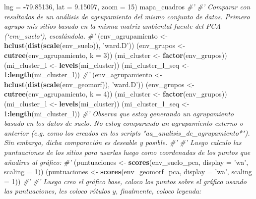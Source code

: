 \documentclass[11pt,]{article}
\newenvironment{Shaded}{\begin{snugshade}}{\end{snugshade}}
\newcommand{\KeywordTok}[1]{\textcolor[rgb]{0.13,0.29,0.53}{\textbf{#1}}}
\newcommand{\DataTypeTok}[1]{\textcolor[rgb]{0.13,0.29,0.53}{#1}}
\newcommand{\DecValTok}[1]{\textcolor[rgb]{0.00,0.00,0.81}{#1}}
\newcommand{\FloatTok}[1]{\textcolor[rgb]{0.00,0.00,0.81}{#1}}
\newcommand{\StringTok}[1]{\textcolor[rgb]{0.31,0.60,0.02}{#1}}
\newcommand{\CommentTok}[1]{\textcolor[rgb]{0.56,0.35,0.01}{\textit{#1}}}
\newcommand{\OperatorTok}[1]{\textcolor[rgb]{0.81,0.36,0.00}{\textbf{#1}}}
\newcommand{\NormalTok}[1]{#1}
\begin{document}
\begin{Shaded}
\begin{Highlighting}[]
{{{{{{{{    \DataTypeTok{lng =} \OperatorTok{-}\FloatTok{79.85136}\NormalTok{,}
    \DataTypeTok{lat =} \FloatTok{9.15097}\NormalTok{,}
    \DataTypeTok{zoom =} \DecValTok{15}\NormalTok{)}
\NormalTok{mapa_cuadros}
\CommentTok{#' }
\CommentTok{#' Comparar con resultados de un análisis de agrupamiento del mismo conjunto de datos. Primero agrupo mis sitios basado en la misma matriz ambiental fuente del PCA (`env_suelo`), escalándola.}
\CommentTok{#' }
\NormalTok{(env_agrupamiento <-}\StringTok{ }\KeywordTok{hclust}\NormalTok{(}\KeywordTok{dist}\NormalTok{(}\KeywordTok{scale}\NormalTok{(env_suelo)), }\StringTok{'ward.D'}\NormalTok{))}
\NormalTok{(env_grupos <-}\StringTok{ }\KeywordTok{cutree}\NormalTok{(env_agrupamiento, }\DataTypeTok{k =} \DecValTok{3}\NormalTok{))}
\NormalTok{(mi_cluster <-}\StringTok{ }\KeywordTok{factor}\NormalTok{(env_grupos))}
\NormalTok{(mi_cluster_l <-}\StringTok{ }\KeywordTok{levels}\NormalTok{(mi_cluster))}
\NormalTok{(mi_cluster_l_seq <-}\StringTok{ }\DecValTok{1}\OperatorTok{:}\KeywordTok{length}\NormalTok{(mi_cluster_l))}
\CommentTok{#' }
\NormalTok{(env_agrupamiento <-}\StringTok{ }\KeywordTok{hclust}\NormalTok{(}\KeywordTok{dist}\NormalTok{(}\KeywordTok{scale}\NormalTok{(env_geomorf)), }\StringTok{'ward.D'}\NormalTok{))}
\NormalTok{(env_grupos <-}\StringTok{ }\KeywordTok{cutree}\NormalTok{(env_agrupamiento, }\DataTypeTok{k =} \DecValTok{4}\NormalTok{))}
\NormalTok{(mi_cluster <-}\StringTok{ }\KeywordTok{factor}\NormalTok{(env_grupos))}
\NormalTok{(mi_cluster_l <-}\StringTok{ }\KeywordTok{levels}\NormalTok{(mi_cluster))}
\NormalTok{(mi_cluster_l_seq <-}\StringTok{ }\DecValTok{1}\OperatorTok{:}\KeywordTok{length}\NormalTok{(mi_cluster_l))}
\CommentTok{#' Observa que estoy generando un agrupamiento basado en los datos de suelo. No estoy comparando un agrupamiento externo o anterior (e.g. como los creados en los scripts "aa_analisis_de_agrupamiento*"). Sin embargo, dicha comparación es deseable y posible.}
\CommentTok{#' }
\CommentTok{#' Luego calculo las puntuaciones de los sitios para usarlas luego como coordenadas de los puntos que añadires al gráfico:}
\CommentTok{#' }
\NormalTok{(puntuaciones <-}\StringTok{ }\KeywordTok{scores}\NormalTok{(env_suelo_pca, }\DataTypeTok{display =} \StringTok{'wa'}\NormalTok{, }\DataTypeTok{scaling =} \DecValTok{1}\NormalTok{))}
\NormalTok{(puntuaciones <-}\StringTok{ }\KeywordTok{scores}\NormalTok{(env_geomorf_pca, }\DataTypeTok{display =} \StringTok{'wa'}\NormalTok{, }\DataTypeTok{scaling =} \DecValTok{1}\NormalTok{))}
\CommentTok{#'}
\CommentTok{#' Luego creo el gráfico base, coloco los puntos sobre el gráfico usando las puntuaciones, les coloco rótulos y, finalmente, coloco leyenda:}
}}}}}}}}
\end{Highlighting}
\end{Shaded}
\end{document}
